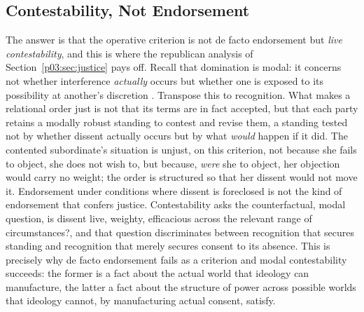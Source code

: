 \documentclass[11pt,a4paper]{article}
\begin{document}
\subsection{Contestability, Not Endorsement}

The answer is that the operative criterion is not de facto endorsement but \emph{live contestability}, and this is where the republican analysis of Section~\ref{p03:sec:justice} pays off. Recall that domination is modal: it concerns not whether interference \emph{actually} occurs but whether one is exposed to its possibility at another's discretion \parencite{pettit1997republicanism}. Transpose this to recognition. What makes a relational order just is not that its terms are in fact accepted, but that each party retains a modally robust standing to contest and revise them, a standing tested not by whether dissent actually occurs but by what \emph{would} happen if it did. The contented subordinate's situation is unjust, on this criterion, not because she fails to object, she does not wish to, but because, \emph{were} she to object, her objection would carry no weight; the order is structured so that her dissent would not move it. Endorsement under conditions where dissent is foreclosed is not the kind of endorsement that confers justice. Contestability asks the counterfactual, modal question, is dissent live, weighty, efficacious across the relevant range of circumstances?, and that question discriminates between recognition that secures standing and recognition that merely secures consent to its absence. This is precisely why de facto endorsement fails as a criterion and modal contestability succeeds: the former is a fact about the actual world that ideology can manufacture, the latter a fact about the structure of power across possible worlds that ideology cannot, by manufacturing actual consent, satisfy.
\end{document}
